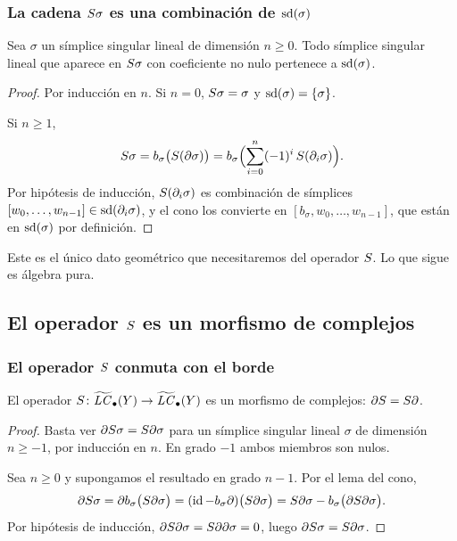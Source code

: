 \begin{frame}
  \frametitle{La cadena $S\sigma$ es una combinación de $\operatorname{sd}(\sigma)$}

  \begin{lemma}
    Sea $\sigma$ un símplice singular lineal de dimensión $n\geq0$. Todo
    símplice singular lineal que aparece en $S\sigma$ con coeficiente no
    nulo pertenece a $\operatorname{sd}(\sigma)$.
  \end{lemma}

  \begin{proof}
    Por inducción en $n$. Si $n=0$, $S\sigma=\sigma$ y $\operatorname{sd}(\sigma)=\{\sigma\}$.

    \medskip

    Si $n\geq1$,
    \[
      S\sigma=b_\sigma\bigl(S(\partial\sigma)\bigr)=b_\sigma\Bigl(\sum_{i=0}^n(-1)^i\,S(\partial_i\sigma)\Bigr).
    \]
    Por hipótesis de inducción, $S(\partial_i\sigma)$ es combinación de
    símplices $[w_0,\ldots,w_{n-1}]\in\operatorname{sd}(\partial_i\sigma)$, y el cono los
    convierte en $[b_\sigma,w_0,\ldots,w_{n-1}]$, que están en
    $\operatorname{sd}(\sigma)$ por definición.
  \end{proof}

  Este es el único dato geométrico que necesitaremos del operador $S$.
  Lo que sigue es álgebra pura.
\end{frame}

\subsection{El operador $S$ es un morfismo de complejos}

\begin{frame}
  \frametitle{El operador $S$ conmuta con el borde}

  \begin{proposition}
    El operador $S\colon\widetilde{\mathit{LC}}_\bullet(Y)\to\widetilde{\mathit{LC}}_\bullet(Y)$ es un
    morfismo de complejos: $\partial S=S\partial$.
  \end{proposition}

  \begin{proof}
    Basta ver $\partial S\sigma=S\partial\sigma$ para un símplice singular
    lineal $\sigma$ de dimensión $n\geq-1$, por inducción en $n$. En grado
    $-1$ ambos miembros son nulos.

    \medskip

    Sea $n\geq0$ y supongamos el resultado en grado $n-1$. Por el lema del
    cono,
    \[
      \partial S\sigma
      =\partial b_\sigma\bigl(S\partial\sigma\bigr)
      =(\operatorname{id}-b_\sigma\partial)\bigl(S\partial\sigma\bigr)
      =S\partial\sigma-b_\sigma\bigl(\partial S\partial\sigma\bigr).
    \]
    Por hipótesis de inducción,
    $\partial S\partial\sigma=S\partial\partial\sigma=0$, luego
    $\partial S\sigma=S\partial\sigma$.
  \end{proof}
\end{frame}

